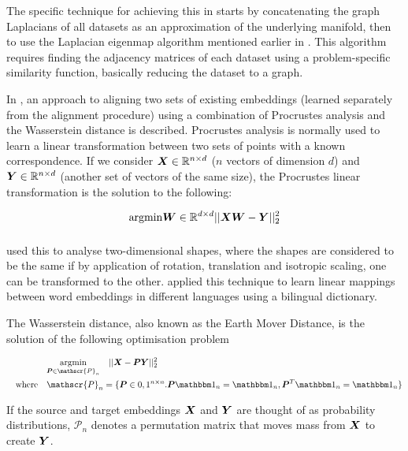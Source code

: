 The specific technique for achieving this in \cite{ManifoldLearningTheoryAndApplications} starts by concatenating the graph Laplacians of all datasets as an approximation of the underlying manifold, then to use the Laplacian eigenmap algorithm mentioned earlier in \cite{LaplacianEigenmaps}. This algorithm requires finding the adjacency matrices of each dataset using a problem-specific similarity function, basically reducing the dataset to a graph. 

In \cite{UnsupervisedAlignmentWP}, an approach to aligning two sets of existing embeddings (learned separately from the alignment procedure) using a combination of Procrustes analysis and the Wasserstein distance is described. Procrustes analysis is normally used to learn a linear transformation between two sets of points with a known correspondence. If we consider $\boldsymbol{X} \in \mathbb{R}^{n \times d}$ ($n$ vectors of dimension $d$) and $\boldsymbol{Y} \in \mathbb{R}^{n \times d}$ (another set of vectors of the same size), the Procrustes linear transformation is the solution to the following:

\begin{equation}
    \underset{\quad}{\operatorname{argmin}}{\boldsymbol{W} \in \mathbb{R}^{d \times d}}  ||\boldsymbol{X} \boldsymbol{W} - \boldsymbol{Y}||_2^2
\end{equation}

\cite{Goodall1991MI} used this to analyse two-dimensional shapes, where the shapes are considered to be the same if by application of rotation, translation and isotropic scaling, one can be transformed to the other. \cite{MikolovMachineTranslation} applied this technique to learn linear mappings between word embeddings in different languages using a bilingual dictionary. 

The Wasserstein distance, also known as the Earth Mover Distance, is the solution of the following optimisation problem

\begin{equation}
\begin{split}
    &\argmin{\vecP \in \mathscr{P}_n} \quad || \vecX - \vecP \vecY ||_2^2 \\
    \spaced{where}&\mathscr{P}_n = \{\vecP \in {0, 1}^{n \times n}. \vecP \one_n = \one_n, \vecP^T \one_n = \one_n \}
\end{split}
\end{equation}

If the source and target embeddings $\boldsymbol{X}$ and $\boldsymbol{Y}$ are thought of as probability distributions, $\mathscr{P}_n$ denotes a permutation matrix that moves mass from $\boldsymbol{X}$ to create $\boldsymbol{Y}$. 

